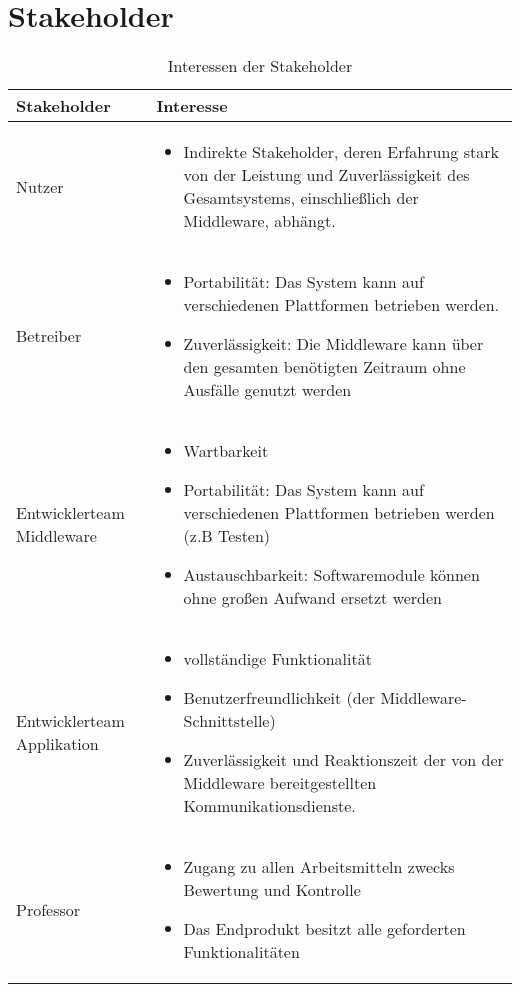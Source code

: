 \section{Stakeholder}
\begin{table}[h!]
	\caption{Interessen der Stakeholder}
	\label{tab:stakeholder}
	\centering
	\begin{tabular}{|p{2.5cm}|p{10cm}|}
		\hline
		\textbf{Stakeholder} & \textbf{Interesse}  \\
		\hline
		Nutzer   
		& \parbox{10cm}{\begin{itemize}
				\item  Indirekte Stakeholder, deren Erfahrung stark von der Leistung und Zuverlässigkeit des Gesamtsystems, einschließlich der Middleware, abhängt.
		\end{itemize}}
		\\
		\hline
		Betreiber 
		&\parbox{10cm}{\begin{itemize}
				\item Portabilität: Das System kann auf verschiedenen Plattformen betrieben werden.
				\item Zuverlässigkeit: Die Middleware kann über den gesamten benötigten Zeitraum ohne Ausfälle genutzt werden
		\end{itemize}}
		\\
		\hline
		Entwicklerteam Middleware
		&\parbox{10cm}{ \begin{itemize}
				\item Wartbarkeit
				\item Portabilität: Das System kann auf verschiedenen Plattformen betrieben werden (z.B Testen)
				\item Austauschbarkeit: Softwaremodule können ohne großen Aufwand ersetzt werden
		\end{itemize}}
		\\
		\hline
		Entwicklerteam Applikation
		&\parbox{10cm}{ \begin{itemize}
				\item vollständige Funktionalität
				\item Benutzerfreundlichkeit (der Middleware-Schnittstelle) 
				\item Zuverlässigkeit und Reaktionszeit der von der Middleware bereitgestellten Kommunikationsdienste.
		\end{itemize}}
		\\
		\hline
		
		Professor & \parbox{10cm}{\begin{itemize}
				\item Zugang zu allen Arbeitsmitteln zwecks Bewertung und Kontrolle
				\item Das Endprodukt besitzt alle geforderten Funktionalitäten
		\end{itemize}}
		\\
		\hline
	\end{tabular}
\end{table}